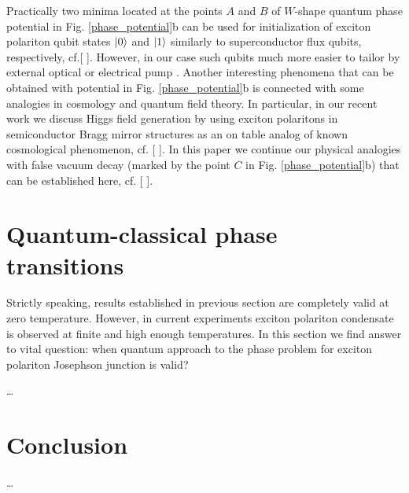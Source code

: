 \documentclass[aps, pre, preprint, groupedaddress, superscriptaddress, showkeys, showpacs] {revtex4-1}
\DeclarePairedDelimiter\ket{\lvert}{\rangle}
\begin{document}
Practically two minima located at the points $A$ and $B$ of $W$-shape quantum phase potential in Fig. \ref{phase_potential}b can be used for initialization of exciton polariton qubit states $\ket{0}$ and $\ket{1}$ similarly to superconductor flux qubits, respectively, {\red cf.[ ]}.
However, in our case such qubits much more easier to tailor by external optical or electrical pump {\red [ ]}.
Another interesting phenomena that can be obtained with potential in Fig. \ref{phase_potential}b is connected with some analogies in cosmology and quantum field theory.
In particular, in our recent work {\red [ ]} we discuss Higgs field generation by using exciton polaritons in semiconductor Bragg mirror structures as an on table analog of known cosmological phenomenon, {\red cf. [ ]}.
In this paper we continue our physical analogies with false vacuum decay (marked by the point $C$ in Fig. \ref{phase_potential}b) that can be established here, {\red cf. [ ]}.

\section{Quantum-classical phase transitions \label{sec:quantum_classical}}

Strictly speaking, results established in previous section are completely valid at zero temperature.
However, in current experiments exciton polariton condensate is observed at finite and high enough temperatures.
In this section we find answer to vital question: when quantum approach to the phase problem for exciton polariton Josephson junction is valid?

\dots

\section{Conclusion \label{sec:conclusion}}

\dots


\end{document}
